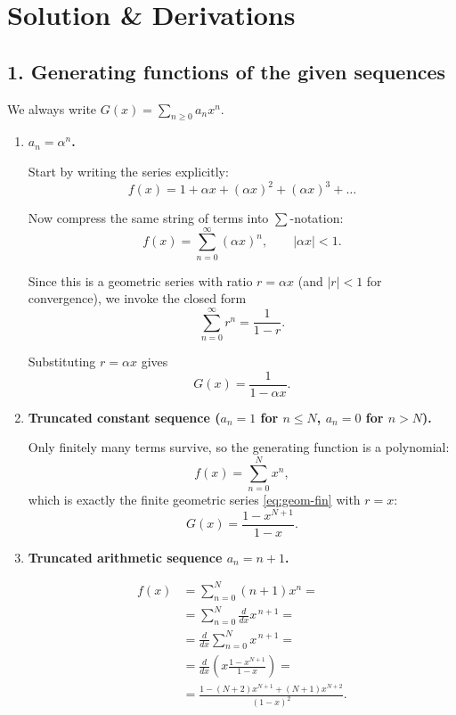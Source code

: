 \documentclass[docmute]{article}
\begin{document}
\section*{Solution \& Derivations}

\subsection*{1. Generating functions of the given sequences}%
We always write $G(x)=\sum_{n\ge0}a_{n}x^{n}$.

\begin{enumerate}[label=\textbf{1(\alph*)}\quad]

\item \textbf{$a_n=\alpha^{n}$.}

Start by writing the series explicitly:
\[
f(x)=1+\alpha x+(\alpha x)^2+(\alpha x)^3+\dots
\]

Now compress the same string of terms into $\sum$-notation:
\[
f(x)=\sum_{n=0}^{\infty}(\alpha x)^{n}, \qquad |\alpha x|<1.
\]

Since this is a geometric series with ratio \(r=\alpha x\) (and \(|r|<1\) for convergence), we invoke the closed form
\[
\sum_{n=0}^{\infty}r^{n}=\frac{1}{1-r}.
\]

Substituting \(r=\alpha x\) gives
\[
\boxed{G(x)=\frac{1}{1-\alpha x}}.
\]


\medskip
\item \textbf{Truncated constant sequence (\(a_n=1\) for \(n\le N\), \(a_n=0\) for \(n>N\)).}

Only finitely many terms survive, so the generating function is a polynomial:
\[
f(x)=\sum_{n=0}^{N}x^{n},
\]
which is exactly the finite geometric series \eqref{eq:geom-fin} with \(r=x\):
\[
\boxed{G(x)=\frac{1-x^{N+1}}{1-x}}.
\]

\medskip
\item \textbf{Truncated arithmetic sequence \(a_n = n+1\).}

\[
\begin{aligned}
f(x)
  &=\sum_{n=0}^{N}(n+1)x^{n}=                              \\
  &=\sum_{n=0}^{N}\frac{d}{dx}x^{\,n+1}=                   \\
  &=\frac{d}{dx}\sum_{n=0}^{N}x^{\,n+1}=                   \\
  &=\frac{d}{dx}\!\left(x\frac{1-x^{N+1}}{1-x}\right)=     \\
  &=\frac{1-(N+2)x^{N+1}+(N+1)x^{N+2}}{(1-x)^{2}}.
\end{aligned}
\]




\end{enumerate}
\end{document}
